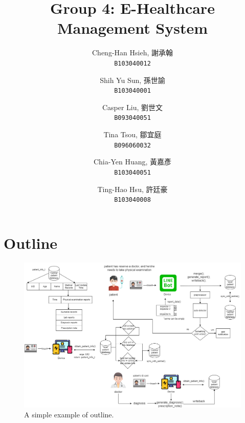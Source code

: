 \documentclass{article}
\begin{document}
\title{Group 4: E-Healthcare Management System}
\author{
  Cheng-Han Hsieh, 謝承翰\\
  \texttt{B103040012}
  \and
  Shih Yu Sun, 孫世諭\\
  \texttt{B103040001}
  \and
  Casper Liu, 劉世文\\
  \texttt{B093040051}
  \and
  Tina Tsou, 鄒宜庭\\
  \texttt{B096060032}
  \and
  Chia-Yen Huang, 黃嘉彥\\
  \texttt{B103040051}
  \and
  Ting-Hao Hsu, 許廷豪\\
  \texttt{B103040008}
}

\maketitle

\section{Outline}
\label{sec:outline}

  \begin{figure}[ht]
    \centering
    \includegraphics[scale = 0.25]{asset/flowchart.png}
    \caption{A simple example of outline.}
    \label{fig:flowchart}
  \end{figure}
\end{document}

